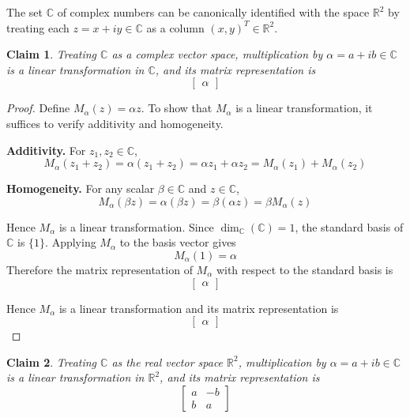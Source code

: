 \documentclass{article}
\newtheorem{claim}{Claim}
\begin{document}
The set $\mathbb{C}$ of complex numbers can be canonically identified with the space $\mathbb{R}^2$ by 
treating each $z = x + iy \in \mathbb{C}$ as a column $(x, y)^T \in \mathbb{R}^2$.

\begin{claim}
    Treating $\mathbb{C}$ as a complex vector space, multiplication by $\alpha = a + ib \in \mathbb{C}$ is 
    a linear transformation in $\mathbb{C}$, and its matrix representation is 
    \[
    \begin{bmatrix}
        \alpha
    \end{bmatrix}
    \]
\end{claim}

\begin{proof}
    Define $M_\alpha(z) = \alpha z$. To show that $M_\alpha$ is a linear transformation, it suffices to 
    verify additivity and homogeneity.

    \medskip

    \textbf{Additivity.} For $z_1, z_2 \in \mathbb{C}$,
    \[
    M_\alpha(z_1 + z_2) = \alpha(z_1 + z_2) = \alpha z_1 + \alpha z_2 = M_\alpha(z_1) + M_\alpha(z_2)
    \]

    \medskip

    \textbf{Homogeneity.} For any scalar $\beta \in \mathbb{C}$ and $z \in \mathbb{C}$,
    \[
    M_\alpha(\beta z) = \alpha(\beta z) = \beta(\alpha z) = \beta M_\alpha(z)
    \]

    \medskip

    Hence $M_\alpha$ is a linear transformation. Since $\dim_\mathbb{C}(\mathbb{C}) = 1$, the standard 
    basis of $\mathbb{C}$ is $\{1\}$. Applying $M_\alpha$ to the basis vector gives
    \[
    M_\alpha(1) = \alpha
    \]
    Therefore the matrix representation of $M_\alpha$ with respect to the standard basis is 
    \[
    \begin{bmatrix}
        \alpha
    \end{bmatrix}
    \]

    \medskip

    Hence $M_\alpha$ is a linear transformation and its matrix representation is 
    \[
    \begin{bmatrix}
        \alpha
    \end{bmatrix}
    \]
\end{proof}

\begin{claim}
    Treating $\mathbb{C}$ as the real vector space $\mathbb{R}^2$, multiplication by 
    $\alpha = a + ib \in \mathbb{C}$ is a linear transformation in $\mathbb{R}^2$, and its matrix 
    representation is 
    \[
    \begin{bmatrix}
        a & -b \\ 
        b & a
    \end{bmatrix}
    \]
\end{claim}
\end{document}
